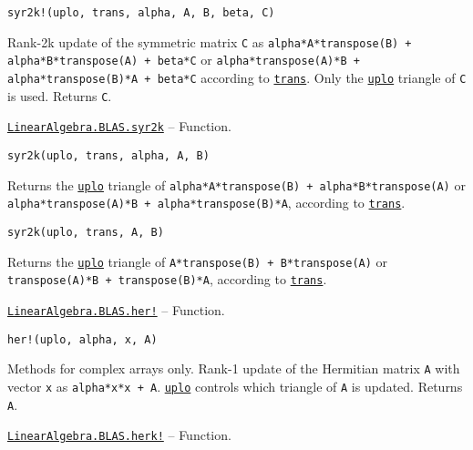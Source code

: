 \begin{adjustwidth}{2em}{0pt}


\begin{verbatim}
syr2k!(uplo, trans, alpha, A, B, beta, C)
\end{verbatim}

Rank-2k update of the symmetric matrix \texttt{C} as \texttt{alpha*A*transpose(B) + alpha*B*transpose(A) + beta*C} or \texttt{alpha*transpose(A)*B + alpha*transpose(B)*A + beta*C} according to \hyperlink{15951037910221396131}{\texttt{trans}}. Only the \hyperlink{13880289478825450693}{\texttt{uplo}} triangle of \texttt{C} is used. Returns \texttt{C}.



\end{adjustwidth}
\hypertarget{8760875486589937064}{} 
\hyperlink{8760875486589937064}{\texttt{LinearAlgebra.BLAS.syr2k}}  -- {Function.}

\begin{adjustwidth}{2em}{0pt}


\begin{verbatim}
syr2k(uplo, trans, alpha, A, B)
\end{verbatim}

Returns the \hyperlink{13880289478825450693}{\texttt{uplo}} triangle of \texttt{alpha*A*transpose(B) + alpha*B*transpose(A)} or \texttt{alpha*transpose(A)*B + alpha*transpose(B)*A}, according to \hyperlink{15951037910221396131}{\texttt{trans}}.




\begin{lstlisting}
syr2k(uplo, trans, A, B)
\end{lstlisting}

Returns the \hyperlink{13880289478825450693}{\texttt{uplo}} triangle of \texttt{A*transpose(B) + B*transpose(A)} or \texttt{transpose(A)*B + transpose(B)*A}, according to \hyperlink{15951037910221396131}{\texttt{trans}}.



\end{adjustwidth}
\hypertarget{13391948874280376128}{} 
\hyperlink{13391948874280376128}{\texttt{LinearAlgebra.BLAS.her!}}  -- {Function.}

\begin{adjustwidth}{2em}{0pt}


\begin{verbatim}
her!(uplo, alpha, x, A)
\end{verbatim}

Methods for complex arrays only. Rank-1 update of the Hermitian matrix \texttt{A} with vector \texttt{x} as \texttt{alpha*x*x{\textquotesingle} + A}. \hyperlink{13880289478825450693}{\texttt{uplo}} controls which triangle of \texttt{A} is updated. Returns \texttt{A}.



\end{adjustwidth}
\hypertarget{13961548415194246627}{} 
\hyperlink{13961548415194246627}{\texttt{LinearAlgebra.BLAS.herk!}}  -- {Function.}

